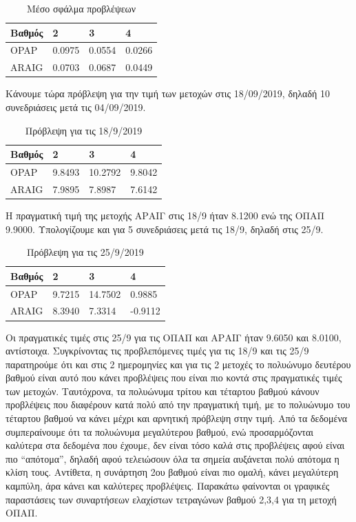 \documentclass[12pt,a4paper]{article}
\begin{document}
\begin{table}[H]
    \centering
    \begin{tabular}{|l|l|l|l|}
    \hline
    Βαθμός & 2      & 3      & 4      \\ \hline
    OPAP   & 0.0975 & 0.0554 & 0.0266 \\ \hline
    ARAIG  & 0.0703 & 0.0687 & 0.0449 \\ \hline
    \end{tabular}
    \caption{Μέσο σφάλμα προβλέψεων}
    \label{tab:stock-comparison}
\end{table}

Κάνουμε τώρα πρόβλεψη για την τιμή των μετοχών στις 18/09/2019, δηλαδή 10 συνεδριάσεις μετά τις 04/09/2019.

\begin{table}[H]
    \centering
    \begin{tabular}{|l|l|l|l|}
    \hline
    Βαθμός & 2      & 3      & 4      \\ \hline
    OPAP   & 9.8493 & 10.2792 & 9.8042 \\ \hline
    ARAIG  & 7.9895 & 7.8987 & 7.6142 \\ \hline
    \end{tabular}
    \caption{Πρόβλεψη για τις 18/9/2019}
    \label{tab:stock-prediction-1}
\end{table}

Η πραγματική τιμή της μετοχής ΑΡΑΙΓ στις 18/9 ήταν 8.1200 ενώ της ΟΠΑΠ 9.9000. 
Υπολογίζουμε και για 5 συνεδριάσεις μετά τις 18/9, δηλαδή στις 25/9.

\begin{table}[H]
    \centering
    \begin{tabular}{|l|l|l|l|}
    \hline
    Βαθμός & 2      & 3      & 4      \\ \hline
    OPAP   & 9.7215 & 14.7502 & 0.9885 \\ \hline
    ARAIG  & 8.3940 & 7.3314  & -0.9112 \\ \hline
    \end{tabular}
    \caption{Πρόβλεψη για τις 25/9/2019}
    \label{tab:stock-prediction-2}
\end{table}

Οι πραγματικές τιμές στις 25/9 για τις ΟΠΑΠ και ΑΡΑΙΓ ήταν 9.6050 και 8.0100, αντίστοιχα. Συγκρίνοντας τις προβλεπόμενες 
τιμές για τις 18/9 και τις 25/9 παρατηρούμε ότι και στις 2 ημερομηνίες και για τις 2 μετοχές το πολυώνυμο δευτέρου βαθμού 
είναι αυτό που κάνει προβλέψεις που είναι πιο κοντά στις πραγματικές τιμές των μετοχών. Ταυτόχρονα, τα πολυώνυμα τρίτου 
και τέταρτου βαθμού κάνουν προβλέψεις που διαφέρουν κατά πολύ από την πραγματική τιμή, με το πολυώνυμο του τέταρτου βαθμού να 
κάνει μέχρι και αρνητική πρόβλεψη στην τιμή. Από τα δεδομένα συμπεραίνουμε ότι τα πολυώνυμα μεγαλύτερου βαθμού, ενώ προσαρμόζονται 
καλύτερα στα δεδομένα που έχουμε, δεν είναι τόσο καλά στις προβλέψεις αφού είναι πιο ``απότομα'', δηλαδή αφού τελειώσουν όλα τα 
σημεία αυξάνεται πολύ απότομα η κλίση τους. Αντίθετα, η συνάρτηση 2ου βαθμού είναι πιο ομαλή, κάνει μεγαλύτερη καμπύλη, άρα 
κάνει και καλύτερες προβλέψεις. Παρακάτω φαίνονται οι γραφικές παραστάσεις των συναρτήσεων ελαχίστων τετραγώνων βαθμού 2,3,4 για 
τη μετοχή ΟΠΑΠ.
\end{document}
